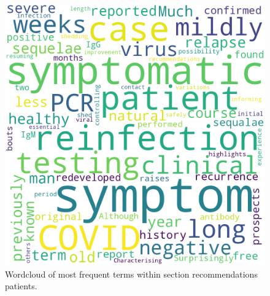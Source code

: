 \documentclass{qqtarticle}
\begin{document}
        \begin{figure}[H]
            \centering
            \includegraphics[width=.75\linewidth]{img/recommendationspatients.png}
            \caption{Wordcloud of most frequent terms within section recommendations patients.}
            \label{fig:wcl_recommendationspatients}
        \end{figure}
\end{document}

